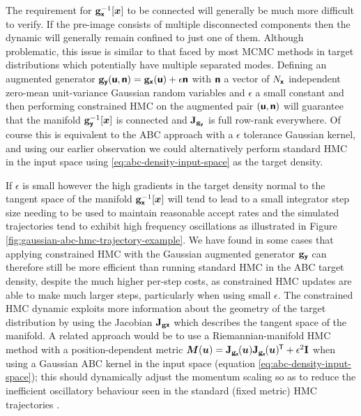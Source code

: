 The requirement for ${\mathbf{g}}_{\boldsymbol{\mathsf{x}}}^{-1}[\boldsymbol{x}]$ to be connected will generally be much more difficult to verify. If the pre-image consists of multiple disconnected components then the dynamic will generally remain confined to just one of them. Although problematic, this issue is similar to that faced by most \ac{MCMC} methods in target distributions which potentially have multiple separated modes. Defining an augmented generator ${\mathbf{g}}_{\boldsymbol{\mathsf{y}}}(\boldsymbol{\mathsf{u}},\boldsymbol{\mathsf{n}}) = {\mathbf{g}}_{\boldsymbol{\mathsf{x}}}(\boldsymbol{\mathsf{u}}) + \epsilon \boldsymbol{\mathsf{n}}$ with $\boldsymbol{\mathsf{n}}$ a vector of $N_{\boldsymbol{\mathsf{x}}}$ independent zero-mean unit-variance Gaussian random variables and $\epsilon$ a small constant and then performing constrained \ac{HMC} on the augmented pair $(\boldsymbol{\mathsf{u}},\boldsymbol{\mathsf{n}})$ will guarantee that the manifold ${\mathbf{g}}_{\boldsymbol{\mathsf{y}}}^{-1}[\boldsymbol{x}]$ is connected and $\mathbf{J}_{{\mathbf{g}}_{\boldsymbol{\mathsf{y}}}}$ is full row-rank everywhere. Of course this is equivalent to the \ac{ABC} approach with a $\epsilon$ tolerance Gaussian kernel, and using our earlier observation we could alternatively perform standard \ac{HMC} in the input space using \eqref{eq:abc-density-input-space} as the target density. 

If $\epsilon$ is small however the high gradients in the target density normal to the tangent space of the manifold ${\mathbf{g}}_{\boldsymbol{\mathsf{x}}}^{-1}[\boldsymbol{x}]$ will tend to lead to a small integrator step size needing to be used to maintain reasonable accept rates and the simulated trajectories tend to exhibit high frequency oscillations as illustrated in Figure \ref{fig:gaussian-abc-hmc-trajectory-example}. We have found in some cases that applying constrained \ac{HMC} with the Gaussian augmented generator ${\mathbf{g}}_{\boldsymbol{\mathsf{y}}}$ can therefore still be more efficient than running standard \ac{HMC} in the \ac{ABC} target density, despite the much higher per-step costs, as constrained \ac{HMC} updates are able to make much larger steps, particularly when using small $\epsilon$. The constrained \ac{HMC} dynamic exploits more information about the geometry of the target distribution by using the Jacobian $\mathbf{J}_{{\mathbf{g}}{\boldsymbol{\mathsf{x}}}}$ which describes the tangent space of the manifold. A related approach would be to use a Riemannian-manifold \ac{HMC} \citep{girolami2011riemann} method with a position-dependent metric $\mtx{M}(\vct{u}) = \jacob{\genfunc_{\rvct{x}}}{\vct{u}}\jacob{\genfunc_{\rvct{x}}}{\vct{u}}\phantom{}\tr + \epsilon^2\idmtx$ when using a Gaussian \ac{ABC} kernel in the input space (equation \eqref{eq:abc-density-input-space}); this should dynamically adjust the momentum scaling so as to reduce the inefficient oscillatory behaviour seen in the standard (fixed metric) \ac{HMC} trajectories \cite{betancourt2013general}.

